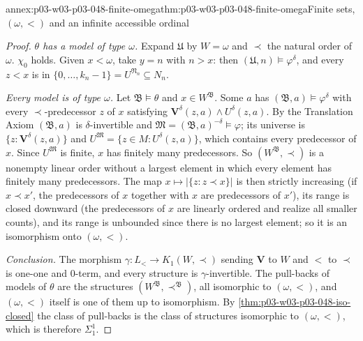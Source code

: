 \begin{annexitem}{annex:p03-w03-p03-048-finite-omega}{thm:p03-w03-p03-048-finite-omega}{Finite sets, \((\omega,<)\) and an infinite accessible ordinal}
\begin{proof}
\emph{\(\theta\) has a model of type \(\omega\).}  Expand \(\mathfrak U\) by
\(W=\omega\) and \(\prec\) the natural order of \(\omega\).  \(\chi_0\)
holds.  Given \(x<\omega\), take \(y=n\) with \(n>x\): then
\((\mathfrak U,n)\models\varphi^{\delta}\), and every \(z<x\) is in
\(\{0,\ldots,k_n-1\}=U^{\mathfrak N_n}\subseteq N_n\).

\emph{Every model is of type \(\omega\).}  Let \(\mathfrak B\models\theta\)
and \(x\in W^{\mathfrak B}\).  Some \(a\) has
\((\mathfrak B,a)\models\varphi^{\delta}\) with every \(\prec\)-predecessor
\(z\) of \(x\) satisfying \(\mathbf V^{\delta}(z,a)\land U^{\delta}(z,a)\).
By the Translation Axiom \((\mathfrak B,a)\) is \(\delta\)-invertible and
\(\mathfrak M=(\mathfrak B,a)^{-\delta}\models\varphi\); its universe is
\(\{z:\mathbf V^{\delta}(z,a)\}\) and \(U^{\mathfrak M}=\{z\in
M:U^{\delta}(z,a)\}\), which contains every predecessor of \(x\).  Since
\(U^{\mathfrak M}\) is finite, \(x\) has finitely many predecessors.  So
\((W^{\mathfrak B},\prec)\) is a nonempty linear order without a largest
element in which every element has finitely many predecessors.  The map
\(x\mapsto|\{z:z\prec x\}|\) is then strictly increasing (if \(x\prec x'\),
the predecessors of \(x\) together with \(x\) are predecessors of \(x'\)),
its range is closed downward (the predecessors of \(x\) are linearly ordered
and realize all smaller counts), and its range is unbounded since there is
no largest element; so it is an isomorphism onto \((\omega,<)\).

\emph{Conclusion.}  The morphism \(\gamma:L_{<}\to K_1(W,\prec)\) sending
\(\mathbf V\) to \(W\) and \(<\) to \(\prec\) is one-one and \(0\)-term, and
every structure is \(\gamma\)-invertible.  The pull-backs of models of
\(\theta\) are the structures \((W^{\mathfrak B},\prec^{\mathfrak B})\), all
isomorphic to \((\omega,<)\), and \((\omega,<)\) itself is one of them up to
isomorphism.  By \cref{thm:p03-w03-p03-048-iso-closed} the class of
pull-backs is the class of structures isomorphic to \((\omega,<)\), which
is therefore \(\Sigma^1_1\).
\end{proof}
\end{annexitem}

